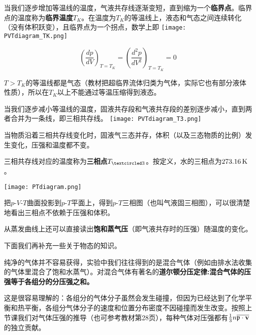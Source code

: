 \documentclass[CJK]{beamer}
\begin{document}
\begin{frame}
\bch
\bitem
\item{\small 当我们逐步增加等温线的温度，气液共存线逐渐变短，直到缩为一个{\bf 临界点}。临界点的温度称为{\bf 临界温度$T_K$}。在温度为$T_K$的等温线上，液态和气态之间连续转化（没有体积跃变），且临界点为一个拐点，数学上即}
\eitem
{}
\texttt{[image: PVTdiagram\_TK.png]}
\emini
{}
{\small
$$\left(\frac{d p}{d V}\right)_{T=T_K} = \left(\frac{d^2 p}{d V^2}\right)_{T=T_K} = 0$$ 
\bitem
\item{$T>T_K$的等温线都是气态{\scriptsize（教材把超临界流体归类为气体，实际它也有部分液体性质）}，所以在$T_K$以上不能通过等温压缩得到液态。}
\eitem
}
\emini
\ech
\end{frame}

\begin{frame}
\bch
\bitem
\item{\small 当我们逐步减小等温线的温度，固液共存段和气液共存段的差别逐步减小，直到两者合并为一条线，即三相共存线。}
\eitem
{}
\texttt{[image: PVTdiagram\_T3.png]}
\emini
{}
{\small
\bitem
\item{当物质沿着三相共存线变化时，固液气三态并存，体积（以及三态物质的比例）发生变化，压强和温度都不变。}
\item{三相共存线对应的温度称为{\bf 三相点$\Tthree$}。按定义，水的三相点为$273.16\,\mathrm{K}$。}
\eitem
}
\emini
\ech
\end{frame}

\begin{frame}
\bch
{}
\texttt{[image: PTdiagram.png]}
\emini
{}
{\small
把$p$-$V$-$T$曲面投影到$p$-$T$平面上，得到$p$-$T$三相图（也叫气液固三相图），可以很清楚地看出三相点不依赖于压强和体积。

从蒸发曲线上还可以直接读出{\bf 饱和蒸气压}（即气液共存时的压强）随温度的变化。}
\emini
\ech
\end{frame}

\begin{frame}
\bch
{}

下面我们再补充一些关于物态的知识。
\ech
\end{frame}


\begin{frame}
\bch
纯净的气体并不容易获得，实验中我们往往得到的是混合气体（例如由排水法收集的气体里混合了饱和水蒸气）。对混合气体有著名的{\bf 道尔顿分压定律:混合气体的压强等于各组分的分压强之和。}

\skipline

这是很容易理解的：各组分的气体分子虽然会发生碰撞，但因为已经达到了化学平衡和热平衡，各组分气体分子的速度和位置分布密度不因碰撞而发生改变。按照上节课我们对气体压强的推导（也可参考教材第28页），每种气体对压强都有$\frac{1}{3}n\overline{\mathbf{\mathfrak{p}}\cdot{\mathbf{v}}}$ 的独立贡献。

\ech
\end{frame}
\end{document}
